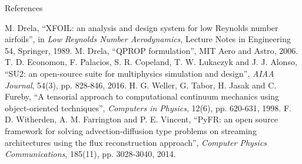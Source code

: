 \documentclass[aspectratio=169,11pt]{beamer}
\begin{document}
\begin{frame}{References}
\begin{reflist}
   
   
   
   
   M. Drela, ``XFOIL: an analysis and design system for low
        Reynolds number airfoils'', in \emph{Low Reynolds Number
        Aerodynamics}, Lecture Notes in Engineering 54, Springer, 1989.
   M. Drela, ``QPROP formulation'', MIT Aero and Astro, 2006.
   T. D. Economon, F. Palacios, S. R. Copeland, T. W. Lukaczyk
        and J. J. Alonso, ``SU2: an open-source suite for multiphysics
        simulation and design'', \emph{AIAA Journal}, 54(3), pp. 828-846,
        2016.
   H. G. Weller, G. Tabor, H. Jasak and C. Fureby, ``A
        tensorial approach to computational continuum mechanics using
        object-oriented techniques'', \emph{Computers in Physics}, 12(6),
        pp. 620-631, 1998.
   F. D. Witherden, A. M. Farrington and P. E. Vincent,
        ``PyFR: an open source framework for solving advection-diffusion type
        problems on streaming architectures using the flux reconstruction
        approach'', \emph{Computer Physics Communications}, 185(11),
        pp. 3028-3040, 2014.
\end{reflist}
\end{frame}
\end{document}
